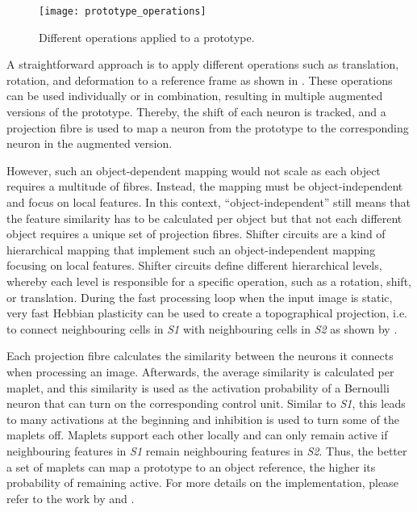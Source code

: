 \begin{figure}[h]
    \centering
    \texttt{[image: prototype\_operations]}
    \caption[Operations applied to a prototype]{Different operations applied to a prototype.}
\end{figure}
A straightforward approach is to apply different operations such as translation, rotation, and deformation to a reference frame as shown in . These operations can be used individually or in combination, resulting in multiple augmented versions of the prototype.
Thereby, the shift of each neuron is tracked, and a projection fibre is used to map a neuron from the prototype to the corresponding neuron in the augmented version.

However, such an object-dependent mapping would not scale as each object requires a multitude of fibres.
Instead, the mapping must be object-independent and focus on local features.
In this context, ``object-independent'' still means that the feature similarity has to be calculated per object but that not each different object requires a unique set of projection fibres.
Shifter circuits  are a kind of hierarchical mapping that implement such an object-independent mapping focusing on local features.
Shifter circuits define different hierarchical levels, whereby each level is responsible for a specific operation, such as a rotation, shift, or translation.
During the fast processing loop when the input image is static, very fast Hebbian plasticity  can be used to create a topographical projection, i.e. to connect neighbouring cells in \emph{S1} with neighbouring cells in \emph{S2} as shown by .

Each projection fibre calculates the similarity between the neurons it connects when processing an image.
Afterwards, the average similarity is calculated per maplet, and this similarity is used as the activation probability of a Bernoulli neuron that can turn on the corresponding control unit.
Similar to \emph{S1}, this leads to many activations at the beginning and inhibition is used to turn some of the maplets off.
Maplets support each other locally and can only remain active if neighbouring features in \emph{S1} remain neighbouring features in \emph{S2}.
Thus, the better a set of maplets can map a prototype to an object reference, the higher its probability of remaining active.
For more details on the implementation, please refer to the work by  and .



